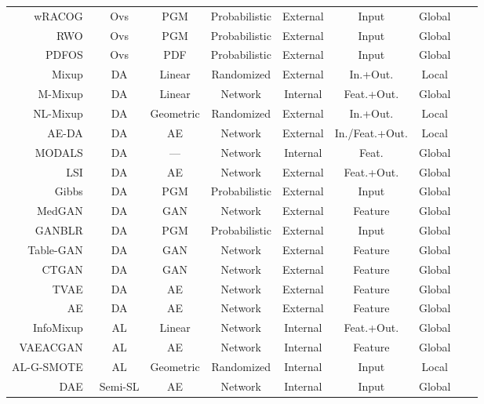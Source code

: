 \documentclass[parskip=full]{scrartcl}
\begin{document}
\begin{longtable}{rcccccccc}
    wRACOG~\cite{das2014racog} & Ovs & PGM & Probabilistic & External & Input & Global \\
    RWO~\cite{zhang2014rwo} & Ovs & PGM & Probabilistic & External & Input & Global \\
    PDFOS~\cite{gao2014pdfos} & Ovs & PDF & Probabilistic & External & Input & Global \\
    Mixup~\cite{zhang2018mixup} & DA & Linear & Randomized & External & In.+Out. & Local \\
    M-Mixup~\cite{verma2019manifold} & DA & Linear & Network & Internal & Feat.+Out. & Global \\
    NL-Mixup~\cite{guo2020nonlinear} & DA & Geometric & Randomized & External & In.+Out. & Local \\
    AE-DA~\cite{feng2020autuencoder} & DA & AE & Network & External & In./Feat.+Out. & Local \\
    MODALS~\cite{cheung2020modals} & DA & --- & Network & Internal & Feat. & Global \\
    LSI~\cite{liu2018data} & DA & AE & Network & External & Feat.+Out. & Global \\
    Gibbs~\cite{fakoor2020fast} & DA & PGM & Probabilistic & External & Input & Global \\
    MedGAN~\cite{armanious2020medgan} & DA & GAN & Network & External & Feature & Global \\
    GANBLR~\cite{zhang2021ganblr} & DA & PGM & Probabilistic & External & Input & Global \\
    Table-GAN~\cite{park2018data} & DA & GAN & Network & External & Feature & Global \\
    CTGAN~\cite{xu2019modeling} & DA & GAN & Network & External & Feature & Global \\
    TVAE~\cite{xu2019modeling} & DA & AE & Network & External & Feature & Global \\
    AE~\cite{delgado2021deep} & DA & AE & Network & External & Feature & Global \\
    InfoMixup~\cite{kim2021lada} & AL & Linear & Network & Internal & Feat.+Out. & Global \\
    VAEACGAN~\cite{tran2019bayesian} & AL & AE & Network & Internal & Feature & Global\\
    AL-G-SMOTE~\cite{fonseca2021increasing} & AL & Geometric & Randomized & Internal & Input & Local\\
    DAE~\cite{rasmus2015semi} & Semi-SL & AE & Network & Internal & Input & Global \\ 

\end{longtable}
\end{document}
